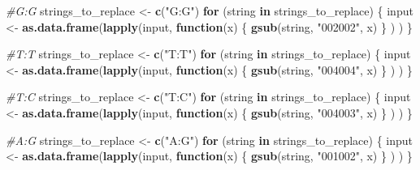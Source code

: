 \documentclass[
]{article}
\newenvironment{Shaded}{\begin{snugshade}}{\end{snugshade}}
\newcommand{\CommentTok}[1]{\textcolor[rgb]{0.56,0.35,0.01}{\textit{#1}}}
\newcommand{\ControlFlowTok}[1]{\textcolor[rgb]{0.13,0.29,0.53}{\textbf{#1}}}
\newcommand{\KeywordTok}[1]{\textcolor[rgb]{0.13,0.29,0.53}{\textbf{#1}}}
\newcommand{\NormalTok}[1]{#1}
\newcommand{\StringTok}[1]{\textcolor[rgb]{0.31,0.60,0.02}{#1}}
\begin{document}
\begin{Shaded}
\begin{Highlighting}[]
\CommentTok{#G:G}
\NormalTok{strings_to_replace <-}\StringTok{ }\KeywordTok{c}\NormalTok{(}\StringTok{"G:G"}\NormalTok{)}
\ControlFlowTok{for}\NormalTok{ (string }\ControlFlowTok{in}\NormalTok{ strings_to_replace) \{ }
\NormalTok{  input <-}\StringTok{ }\KeywordTok{as.data.frame}\NormalTok{(}\KeywordTok{lapply}\NormalTok{(input, }\ControlFlowTok{function}\NormalTok{(x) \{ }
                                \KeywordTok{gsub}\NormalTok{(string, }\StringTok{"002002"}\NormalTok{, x)}
\NormalTok{                                \}}
\NormalTok{                              )}
\NormalTok{                        )}
\NormalTok{  \}}

\CommentTok{#T:T}
\NormalTok{strings_to_replace <-}\StringTok{ }\KeywordTok{c}\NormalTok{(}\StringTok{"T:T"}\NormalTok{)}
\ControlFlowTok{for}\NormalTok{ (string }\ControlFlowTok{in}\NormalTok{ strings_to_replace) \{ }
\NormalTok{  input <-}\StringTok{ }\KeywordTok{as.data.frame}\NormalTok{(}\KeywordTok{lapply}\NormalTok{(input, }\ControlFlowTok{function}\NormalTok{(x) \{ }
                                \KeywordTok{gsub}\NormalTok{(string, }\StringTok{"004004"}\NormalTok{, x)}
\NormalTok{                                \}}
\NormalTok{                              )}
\NormalTok{                        )}
\NormalTok{  \}  }

\CommentTok{#T:C}
\NormalTok{strings_to_replace <-}\StringTok{ }\KeywordTok{c}\NormalTok{(}\StringTok{"T:C"}\NormalTok{)}
\ControlFlowTok{for}\NormalTok{ (string }\ControlFlowTok{in}\NormalTok{ strings_to_replace) \{ }
\NormalTok{  input <-}\StringTok{ }\KeywordTok{as.data.frame}\NormalTok{(}\KeywordTok{lapply}\NormalTok{(input, }\ControlFlowTok{function}\NormalTok{(x) \{ }
                                \KeywordTok{gsub}\NormalTok{(string, }\StringTok{"004003"}\NormalTok{, x)}
\NormalTok{                                \}}
\NormalTok{                              )}
\NormalTok{                        )}
\NormalTok{  \} }

\CommentTok{#A:G}
\NormalTok{strings_to_replace <-}\StringTok{ }\KeywordTok{c}\NormalTok{(}\StringTok{"A:G"}\NormalTok{)}
\ControlFlowTok{for}\NormalTok{ (string }\ControlFlowTok{in}\NormalTok{ strings_to_replace) \{ }
\NormalTok{  input <-}\StringTok{ }\KeywordTok{as.data.frame}\NormalTok{(}\KeywordTok{lapply}\NormalTok{(input, }\ControlFlowTok{function}\NormalTok{(x) \{ }
                                \KeywordTok{gsub}\NormalTok{(string, }\StringTok{"001002"}\NormalTok{, x)}
\NormalTok{                                \}}
\NormalTok{                              )}
\NormalTok{                        )}
\NormalTok{  \} }


\end{Highlighting}
\end{Shaded}
\end{document}
